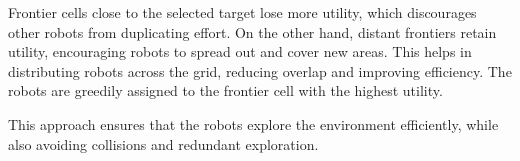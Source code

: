 Frontier cells close to the selected target lose more utility, which discourages other robots from duplicating effort.
On the other hand, distant frontiers retain utility, encouraging robots to spread out and cover new areas.
This helps in distributing robots across the grid, reducing overlap and improving efficiency.
The robots are greedily assigned to the frontier cell with the highest utility.

This approach ensures that the robots explore the environment efficiently, while also avoiding collisions and redundant exploration.
